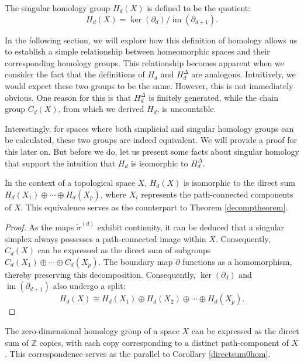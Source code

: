 \begin{definition}
    The singular homology group $H_d(X)$ is defined to be the quotient:
    \[
        H_d(X) = \ker(\partial_d) / \operatorname{im}(\partial_{d+1}).
    \]
\end{definition}

In the following section, we will explore how this definition of homology allows us to establish a simple relationship between homeomorphic spaces and their corresponding homology groups. This relationship becomes apparent when we consider the fact that the definitions of $H_d$ and $H^\Delta_d$ are analogous. Intuitively, we would expect these two groups to be the same. However, this is not immediately obvious. One reason for this is that $H^\Delta_d$ is finitely generated, while the chain group $C_d(X)$, from which we derived $H_d$, is uncountable.

Interestingly, for spaces where both simplicial and singular homology groups can be calculated, these two groups are indeed equivalent. We will provide a proof for this later on. But before we do, let us present some facts about singular homology that support the intuition that $H_d$ is isomorphic to $H^\Delta_d$.

\begin{proposition}
    In the context of a topological space $X$, $H_d(X)$ is isomorphic to the direct sum $H_d(X_1) \oplus \cdots \oplus H_d(X_p)$, where $X_i$ represents the path-connected components of $X$. This equivalence serves as the counterpart to Theorem \ref{decomptheorem}.
\end{proposition}

\begin{proof}
    As the maps $\tilde{\sigma}^{(d)}$ exhibit continuity, it can be deduced that a singular simplex always possesses a path-connected image within $X$. Consequently, $C_d(X)$ can be expressed as the direct sum of subgroups $C_d(X_1) \oplus \cdots \oplus C_d(X_p)$. The boundary map $\partial$ functions as a homomorphism, thereby preserving this decomposition. Consequently, $\ker(\partial_d)$ and $\operatorname{im}(\partial_{d+1})$ also undergo a split:
    \[
        H_d(X) \cong H_d(X_1) \oplus H_d(X_2) \oplus \cdots \oplus H_d(X_p).
    \]
\end{proof}

\begin{proposition}
    The zero-dimensional homology group of a space $X$ can be expressed as the direct sum of $\mathbb{Z}$ copies, with each copy corresponding to a distinct path-component of $X$. This correspondence serves as the parallel to Corollary \ref{directsum0hom}.
\end{proposition}

